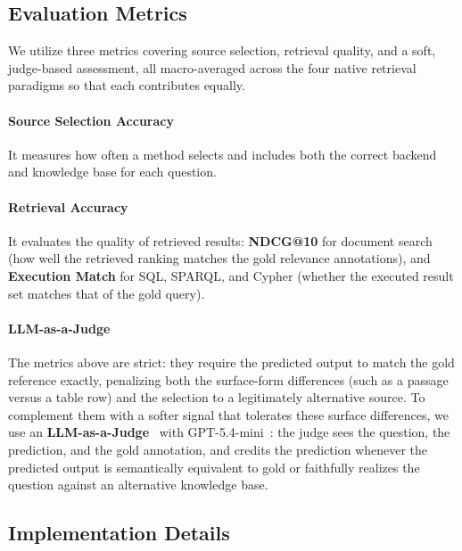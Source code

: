 \documentclass{llmxive}
\begin{document}
\subsection{Evaluation Metrics}

We utilize three metrics covering source selection, retrieval quality, and a soft, judge-based assessment, all macro-averaged across the four native retrieval paradigms so that each contributes equally.

\vspace{-0.025in}
\paragraph{Source Selection Accuracy}
It measures how often a method selects and includes both the correct backend and knowledge base for each question.

\vspace{-0.025in}
\paragraph{Retrieval Accuracy}
It evaluates the quality of retrieved results: \textbf{NDCG@10} for document search (how well the retrieved ranking matches the gold relevance annotations), and \textbf{Execution Match} for SQL, SPARQL, and Cypher (whether the executed result set matches that of the gold query).

\vspace{-0.025in}
\paragraph{LLM-as-a-Judge}
The metrics above are strict: they require the predicted output to match the gold reference exactly, penalizing both the surface-form differences (such as a passage versus a table row) and the selection to a legitimately alternative source. To complement them with a softer signal that tolerates these surface differences, we use an \textbf{LLM-as-a-Judge}~\citep{GEval} with GPT-5.4-mini~\citep{GPT-54}: the judge sees the question, the prediction, and the gold annotation, and credits the prediction whenever the predicted output is semantically equivalent to gold or faithfully realizes the question against an alternative knowledge base.

\subsection{Implementation Details}
\end{document}
